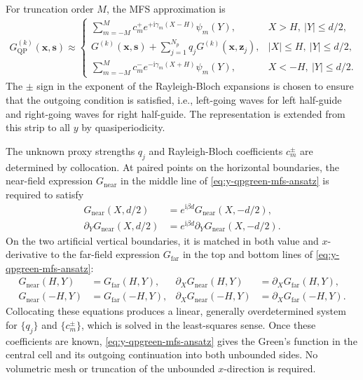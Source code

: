 \documentclass[11pt,fleqn]{article}
\newcommand{\ii}{\mathrm{i}}
\theoremstyle{definition}
\theoremstyle{remark}
\begin{document}
For truncation order
$M$, the MFS approximation is
\begin{align}
  G_{\mathrm{QP}}^{(k)}(\mathbf{x},\mathbf{s})\approx
  \begin{cases}
    \displaystyle
    \sum_{m=-M}^{M}c_m^+
    e^{+\ii\gamma_m(X-H)}\psi_m(Y),
    & X>H,\ |Y|\leq d/2,\\[0.6em]
    \displaystyle
    G^{(k)}(\mathbf{x},\mathbf{s})
    +\sum_{j=1}^{N_p}q_jG^{(k)}(\mathbf{x},\mathbf{z}_j),
    & |X|\leq H,\ |Y|\leq d/2,\\[0.6em]
    \displaystyle
    \sum_{m=-M}^{M}c_m^-
    e^{-\ii\gamma_m(X+H)}\psi_m(Y),
    & X<-H,\ |Y|\leq d/2.
  \end{cases}
  \label{eq:y-qpgreen-mfs-ansatz}
\end{align}
The $\pm$ sign in the exponent of the Rayleigh-Bloch expansions is chosen to ensure that the outgoing condition is satisfied, i.e., left-going waves for left half-guide and right-going waves for right half-guide.
The representation is extended from this strip to all $y$ by quasiperiodicity.

The unknown proxy strengths $q_j$ and Rayleigh-Bloch coefficients $c_m^\pm$
are determined by collocation. At paired points on the horizontal boundaries,
the near-field expression $G_{\mathrm{near}}$ in the middle line of
\eqref{eq:y-qpgreen-mfs-ansatz} is required to satisfy
\begin{align}
  G_{\mathrm{near}}(X,d/2)
  &=e^{\ii\beta d}G_{\mathrm{near}}(X,-d/2),\\
  \partial_YG_{\mathrm{near}}(X,d/2)
  &=e^{\ii\beta d}\partial_YG_{\mathrm{near}}(X,-d/2).
\end{align}
On the two artificial vertical boundaries, it is matched in both value and
$x$-derivative to the far-field expression $G_{\mathrm{far}}$ in the top and bottom lines of \eqref{eq:y-qpgreen-mfs-ansatz}:
\begin{align}
  G_{\mathrm{near}}(H,Y)&=G_{\mathrm{far}}(H,Y),&
  \partial_XG_{\mathrm{near}}(H,Y)&=\partial_XG_{\mathrm{far}}(H,Y),\\
  G_{\mathrm{near}}(-H,Y)&=G_{\mathrm{far}}(-H,Y),&
  \partial_XG_{\mathrm{near}}(-H,Y)&=\partial_XG_{\mathrm{far}}(-H,Y).
\end{align}
Collocating these equations produces a linear, generally overdetermined system
for $\{q_j\}$ and $\{c_m^\pm\}$, which is solved in the least-squares sense.
Once these coefficients are known, \eqref{eq:y-qpgreen-mfs-ansatz} gives the
Green's function in the central cell and its outgoing continuation into both
unbounded sides. No volumetric mesh or truncation of the unbounded
$x$-direction is required.
\end{document}
